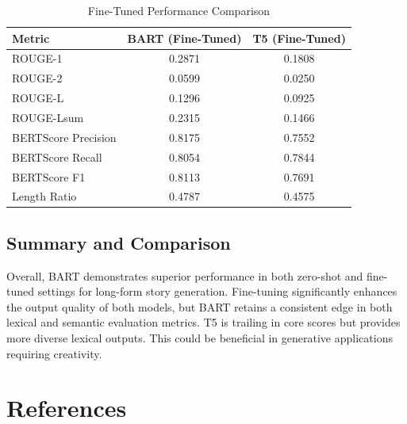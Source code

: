 \documentclass[11pt]{article}
\begin{document}
\begin{table}[H]
\centering
\small
\setlength{\tabcolsep}{3pt} %
\caption{Fine-Tuned Performance Comparison}
\begin{tabular}{lcc}
\toprule
\textbf{Metric} & \textbf{BART (Fine-Tuned)} & \textbf{T5 (Fine-Tuned)} \\
\midrule
ROUGE-1 & 0.2871 & 0.1808 \\
ROUGE-2 & 0.0599 & 0.0250 \\
ROUGE-L & 0.1296 & 0.0925 \\
ROUGE-Lsum & 0.2315 & 0.1466 \\
BERTScore Precision & 0.8175 & 0.7552 \\
BERTScore Recall & 0.8054 & 0.7844 \\
BERTScore F1 & 0.8113 & 0.7691 \\
Length Ratio & 0.4787 & 0.4575 \\
\bottomrule
\end{tabular}
\label{tab:finetuned-results}
\end{table}

\subsection{Summary and Comparison}
Overall, BART demonstrates superior performance in both zero-shot and fine-tuned settings for long-form story generation. Fine-tuning significantly enhances the output quality of both models, but BART retains a consistent edge in both lexical and semantic evaluation metrics. T5 is trailing in core scores but provides more diverse lexical outputs. This could be beneficial in generative applications requiring creativity.

\section*{References}
\end{document}
